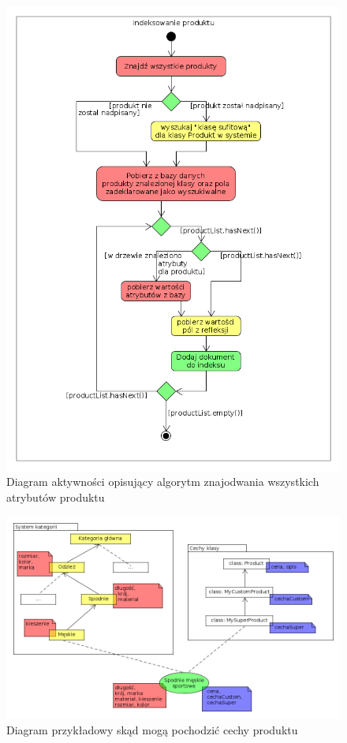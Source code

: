 \begin{figure}
	\begin{center}
		\includegraphics[scale=0.5]{diagramaktywIndeks.png}
	\end{center}
	\caption{{\color{black}Diagram aktywności opisujący algorytm znajodwania wszystkich atrybutów produktu}} \label{diagramaktywIndeks}
\end{figure}
\begin{figure}
	\begin{center}
		\includegraphics[scale=0.5]{cechyProd.png}
	\end{center}
	\caption{{\color{black}Diagram przykładowy skąd mogą pochodzić cechy produktu}} \label{cechyProd}
\end{figure}


